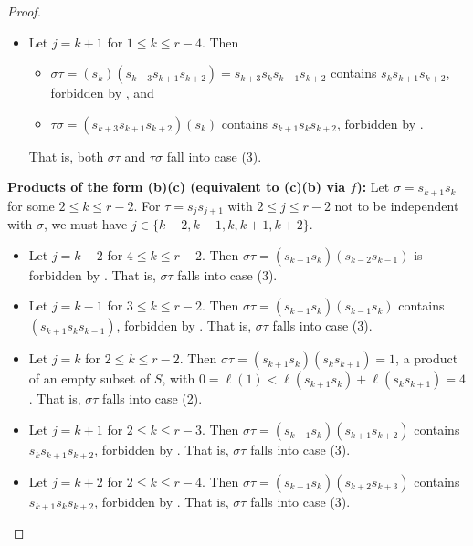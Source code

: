 \documentclass[10pt,a4paper]{amsart}
\begin{document}
\begin{proof}
\begin{itemize}
\begin{itemize}
        \end{itemize}
        That is, $\sigma\tau$ falls into case (1) and $\tau\sigma$ falls into case (3).
        \item Let $j=k+1$ for $1\leq k\leq r-4$. Then \begin{itemize}
            \item $\sigma\tau= (s_{k})(s_{k+3}s_{k+1}s_{k+2})=s_{k+3}s_ks_{k+1}s_{k+2}$ contains $s_ks_{k+1}s_{k+2}$, forbidden by , and
            \item $\tau\sigma= (s_{k+3}s_{k+1}s_{k+2})(s_{k})$ contains $s_{k+1}s_ks_{k+2}$, forbidden by .
        \end{itemize}
        That is, both $\sigma\tau$ and $\tau\sigma$ fall into case (3).
    \end{itemize}
\smallskip

\noindent \textbf{Products of the form (b)(c) (equivalent to (c)(b) via $f$):}
    Let $\sigma=s_{k+1}s_k$ for some $2\leq k\leq r-2$. For $\tau=s_js_{j+1}$ with $2\leq j\leq r-2$ not to be independent with $\sigma$, we must have $j\in\{k-2,k-1,k,k+1,k+2\}$.
    \begin{itemize}
        \item Let $j=k-2$ for $4\leq k\leq r-2$. Then $\sigma\tau= (s_{k+1}s_k)(s_{k-2}s_{k-1})$ is forbidden by . That is, $\sigma\tau$ falls into case (3).
        \item Let $j=k-1$ for $3\leq k\leq r-2$. Then $\sigma\tau= (s_{k+1}s_k)(s_{k-1}s_{k})$ contains $(s_{k+1}s_ks_{k-1})$, forbidden by . That is, $\sigma\tau$ falls into case (3).
        \item Let $j=k$ for $2\leq k\leq r-2$. Then $\sigma\tau= (s_{k+1}s_k)(s_{k}s_{k+1})=1$, a product of an empty subset of $S$, {with $0=\ell(1)<\ell(s_{k+1}s_k)+\ell(s_{k}s_{k+1})=4$.} That is, $\sigma\tau$ falls into case (2).
        \item Let $j=k+1$ for $2\leq k\leq r-3$. Then $\sigma\tau= (s_{k+1}s_k)(s_{k+1}s_{k+2}) $ contains $s_ks_{k+1}s_{k+2}$, forbidden by . That is, $\sigma\tau$ falls into case (3).
        \item Let $j=k+2$ for $2\leq k\leq r-4$. Then $\sigma\tau= (s_{k+1}s_k)(s_{k+2}s_{k+3})$ contains $s_{k+1}s_ks_{k+2}$, forbidden by . That is, $\sigma\tau$ falls into case (3).
    \end{itemize}
    
\smallskip


\end{proof}
\end{document}
